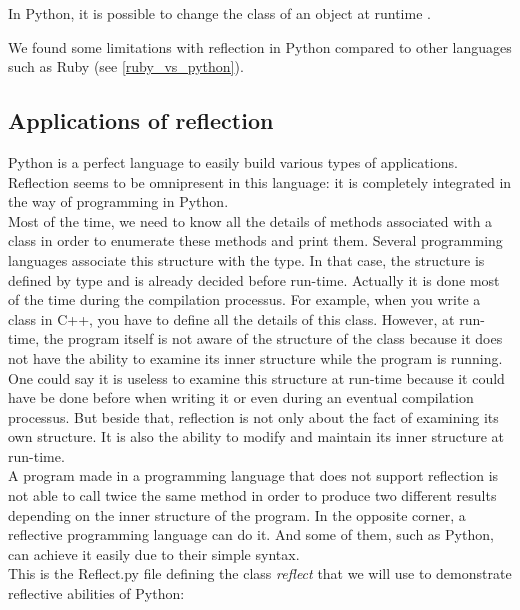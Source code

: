 In Python, it is possible to change the class of an object at runtime \cite{dynamic_lang_study}.

We found some limitations with reflection in Python compared to other languages such as Ruby (see \autoref{ruby_vs_python}).


\subsection{Applications of reflection}

Python is a perfect language to easily build various types of applications. 
Reflection seems to be omnipresent in this language: it is completely integrated in the way of programming in Python.\\

Most of the time, we need to know all the details of methods associated with a class in order to enumerate these methods and print them. Several programming languages associate this structure with the type. In that case, the structure is defined by type and is already decided before run-time. Actually it is done most of the time during the compilation processus. For example, when you write a class in C++, you have to define all the details of this class. However, at run-time, the program itself is not aware of the structure of the class because it does not have the ability to examine its inner structure while the program is running.\\
One could say it is useless to examine this structure at run-time because it could have be done before when writing it or even during an eventual compilation processus. But beside that, reflection is not only about the fact of examining its own structure. It is also the ability to modify and maintain its inner structure at run-time.\\
A program made in a programming language that does not support reflection is not able to call twice the same method in order to produce two different results depending on the inner structure of the program. In the opposite corner, a reflective programming language can do it. And some of them, such as Python, can achieve it easily due to their simple syntax. \cite{assembleforce} \\


This is the Reflect.py file defining the class \emph{reflect} that we will use to demonstrate reflective abilities of Python:


